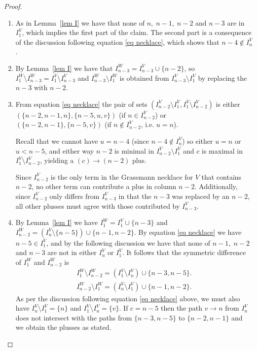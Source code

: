 \documentclass[11pt]{article}
\theoremstyle{remark}
\theoremstyle{definition}
\begin{document}
\begin{proof}
\begin{enumerate}  

\item As in Lemma~\ref{lem I} we have that none of $n,\; n-1, \; n-2$ and $n-3$ are in $I_1^V$, which implies the first part of the claim. The second part is a consequence of the discussion following equation \eqref{eq necklace}, which shows that $n-4 \not\in I_n^V$. 

\item By Lemma~\ref{lem I} we have that $I_{n-3}^W = I_{n-3}^V \cup \{n-2\}$, so $I_{1}^W \setminus I_{n-3}^W = I_1^V \setminus I_{n-3}^V$ and $I_{n-3}^W \setminus I_1^W$ is obtained from $I_{n-3}^V \setminus I_{1}^V$ by replacing the $n-3$ with $n-2$.    

\item From equation \eqref{eq necklace} the pair of sets $(I_{n-2}^V\setminus I_1^V, I_1^V\setminus I_{n-2}^V)$ is either $(\{n-2, n-1, n\}, \{n-5, u, v\})$ (if $n \in I_{n-2}^V$) or $(\{n-2, n-1\}, \{n-5, v\})$ (if $n \not\in I_{n-2}^V$, i.e. $u = n$).

Recall that we cannot have $u = n-4$ (since $n-4 \notin I_n^V$) so either $u = n$ or $u < n-5$, and either way $n-2$ is minimal in $I_{n-2}^V\setminus I_1^V$ and $c$ is maximal in $I_1^V \setminus I_{n-2}^V$, yielding a $(c) \rightarrow (n-2)$ plus. 

Since $I_{n-2}^V$ is the only term in the Grassmann necklace for $V$ that contains $n-2$, no other term can contribute a plus in column $n-2$. Additionally, since $I_{n-2}^V$ only differs from $I_{n-3}^V$ in that the $n-3$ was replaced by an $n-2$, all other plusses must agree with those contributed by $I_{n-3}^V$. 

\item By Lemma~\ref{lem I} we have $I_1^W = I_1^V\cup \{n-3\}$ and $I_{n-2}^W = (I_n^V \setminus \{n-5\}) \cup \{n-1,n-2\}$. By equation \eqref{eq necklace} we have $n-5 \in I_1^V$, and by the following discussion we have that none of $n-1,\;n-2$ and $n-3$ are not in either $I_n^V$ or $I_1^V$. It follows that the symmetric difference of $I_1^W$ and $I_{n-2}^W$ is
    \begin{gather*}
    I_1^W \setminus I_{n-2}^W  = (I_1^V\setminus I_n^V) \cup \{n-3, n-5\}. \\
    I_{n-2}^W \setminus I_1^W  = (I_n^V\setminus I_1^V) \cup \{n-1, n-2\}.
\end{gather*}
As per the discussion following equation \eqref{eq necklace} above, we must also have $I_n^V\setminus I_1^V = \{n\}$ and ${I_1^V\setminus I_n^V = \{v\}}$. If $c = n-5$ then the path $v \rightarrow n$ from $I_n^V$ does not intersect with the paths from $\{n-3, n-5\}$ to $\{n-2, n-1\}$ and we obtain the plusses as stated.
    

\end{enumerate}
\end{proof}
\end{document}
